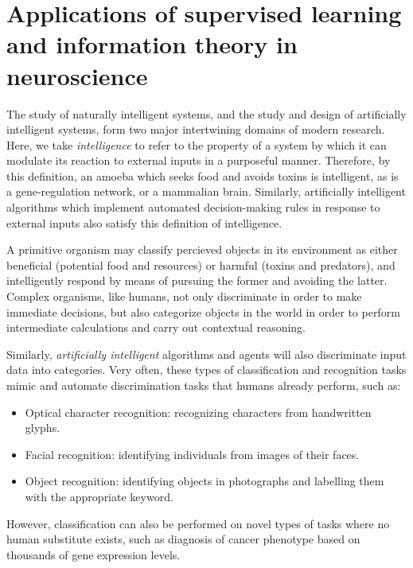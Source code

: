 


\section{Applications of supervised learning and information theory in neuroscience}

The study of naturally intelligent systems, and the study and design
of artificially intelligent systems, form two major intertwining
domains of modern research.  Here, we take \emph{intelligence} to
refer to the property of a system by which it can modulate its
reaction to external inputs in a purposeful manner.  Therefore, by
this definition, an amoeba which seeks food and avoids toxins is
intelligent, as is a gene-regulation network, or a mammalian brain.
Similarly, artificially intelligent algorithms which implement
automated decision-making rules in response to external inputs also
satisfy this definition of intelligence.

A primitive organism may classify percieved objects in its environment
as either beneficial (potential food and resources) or harmful (toxins
and predators), and intelligently respond by means of pursuing the
former and avoiding the latter.  %
Complex organisms, like humans, not
only discriminate in order to make immediate decisions, but also
categorize objects in the world in order to perform intermediate
calculations and carry out contextual reasoning.



Similarly, \emph{artificially intelligent} algorithms and agents will
also discriminate input data into categories.  Very often, these types
of classification and recognition tasks mimic and automate
discrimination tasks that humans already perform, such as:
\begin{itemize}
\item Optical character recognition: recognizing characters from handwritten glyphs.
\item Facial recognition: identifying individuals from images of their faces.
\item Object recognition: identifying objects in photographs and labelling them with the appropriate keyword.
\end{itemize}
However, classification can also be performed on novel types of tasks
where no human substitute exists, such as diagnosis of cancer
phenotype based on thousands of gene expression levels.

